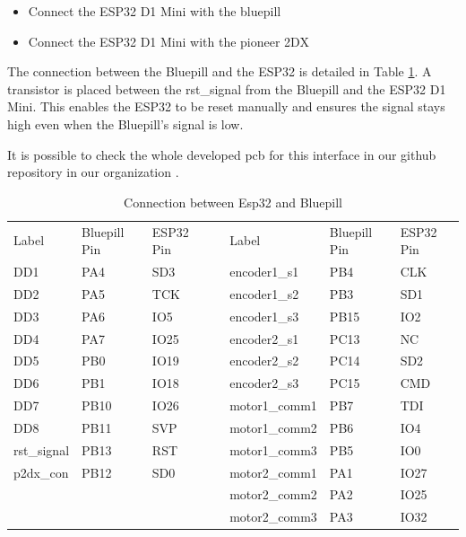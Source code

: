\documentclass[../../monografia.tex]{subfiles}
\begin{document}
\begin{itemize}
    \item {Connect the ESP32 D1 Mini with the bluepill}
    \item {Connect the ESP32 D1 Mini with the pioneer 2DX}
\end{itemize}

The connection between the Bluepill and the ESP32 is detailed in Table \ref{table: Connection between Esp32 and Bluepill}. A transistor is placed between the rst\_signal from the Bluepill and the ESP32 D1 Mini. This enables the ESP32 to be reset manually and ensures the signal stays high even when the Bluepill’s signal is low.

It is possible to check the whole developed pcb for this interface in our github repository in our organization \cite{pioneer_2dx_interface_pcb_2024}.

\begin{table}[h!]
\caption{Connection between Esp32 and Bluepill}
\begin{tabular}{|l|l|l|l|l|l|l|}
\cline{1-3} \cline{5-7}
Label       & Bluepill Pin & ESP32 Pin &  & Label         & Bluepill Pin & ESP32 Pin \\ \cline{1-3} \cline{5-7} 
DD1         & PA4          & SD3       &  & encoder1\_s1  & PB4          & CLK       \\ \cline{1-3} \cline{5-7} 
DD2         & PA5          & TCK       &  & encoder1\_s2  & PB3          & SD1       \\ \cline{1-3} \cline{5-7} 
DD3         & PA6          & IO5       &  & encoder1\_s3  & PB15         & IO2       \\ \cline{1-3} \cline{5-7} 
DD4         & PA7          & IO25      &  & encoder2\_s1  & PC13         & NC        \\ \cline{1-3} \cline{5-7} 
DD5         & PB0          & IO19      &  & encoder2\_s2  & PC14         & SD2       \\ \cline{1-3} \cline{5-7} 
DD6         & PB1          & IO18      &  & encoder2\_s3  & PC15         & CMD       \\ \cline{1-3} \cline{5-7} 
DD7         & PB10         & IO26      &  & motor1\_comm1 & PB7          & TDI       \\ \cline{1-3} \cline{5-7} 
DD8         & PB11         & SVP       &  & motor1\_comm2 & PB6          & IO4       \\ \cline{1-3} \cline{5-7} 
rst\_signal & PB13         & RST       &  & motor1\_comm3 & PB5          & IO0       \\ \cline{1-3} \cline{5-7} 
p2dx\_con   & PB12         & SD0       &  & motor2\_comm1 & PA1          & IO27      \\ \cline{1-3} \cline{5-7} 
            &              &           &  & motor2\_comm2 & PA2          & IO25      \\ \cline{1-3} \cline{5-7} 
            &              &           &  & motor2\_comm3 & PA3          & IO32      \\ \cline{1-3} \cline{5-7} 
\end{tabular}
\label{table: Connection between Esp32 and Bluepill}
\end{table}
\end{document}
